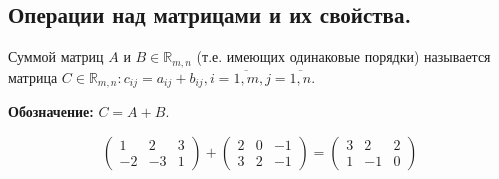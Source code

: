 \subsection{Операции над матрицами и их свойства.}
\begin{definition}
  Суммой матриц $A$ и $B \in \mathds{R}_{m,n}$ (т.е. имеющих одинаковые порядки) называется матрица $C \in \mathds{R}_{m,n}:c_{ij}=a_{ij}+b_{ij}, i = \overline{1,m}, j = \overline{1,n}$.
\end{definition}
\textbf{Обозначение:} $C = A + B$.

\begin{example}
  \[ \begin{pmatrix}
    1& 2& 3\\
    -2& -3& 1
  \end{pmatrix} + \begin{pmatrix}
    2& 0& -1\\
    3& 2& -1
  \end{pmatrix} = \begin{pmatrix}
    3& 2& 2\\
    1& -1& 0
  \end{pmatrix} \]
\end{example}

\begin{properties}
  \begin{enumerate}

  \end{enumerate}
\end{properties}
